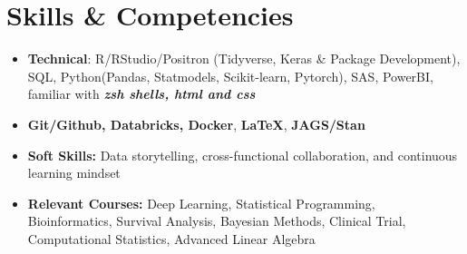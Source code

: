\documentclass[letterpaper,11pt]{article}
\newcommand{\resumeSubHeadingListStart}{\begin{itemize}[leftmargin=0pt]}
\newcommand{\resumeSubHeadingListEnd}{\end{itemize}}
\begin{document}
\section{Skills \& Competencies}
\resumeSubHeadingListStart
\item[]{
	\textbf{Technical}{: R/RStudio/Positron (Tidyverse, Keras \& Package Development), SQL, Python(Pandas, Statmodels, Scikit-learn, Pytorch), SAS, PowerBI, familiar with \textbf{\textit{zsh shells, html and css}}}\vspace{-8pt}
}
\item[]{\textbf{Git/Github,  Databricks, Docker}, \textbf{\LaTeX}}, \textbf{JAGS/Stan}\vspace{-8pt}
\item[]{
	\textbf{Soft Skills:} Data storytelling, cross-functional collaboration, and continuous learning mindset
}\vspace{-8pt}
\item[]{\textbf{Relevant Courses:} Deep Learning, Statistical Programming, Bioinformatics, Survival Analysis, Bayesian Methods, Clinical Trial, Computational Statistics, Advanced Linear Algebra}\vspace{-8pt}
\resumeSubHeadingListEnd
\end{document}
